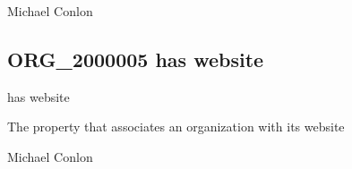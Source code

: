 \documentclass[letterpaper,10pt,english]{sphinxmanual}
\begin{document}
\begin{sphinxShadowBox}

\sphinxAtStartPar
{}
\end{sphinxShadowBox}

\begin{sphinxShadowBox}

\sphinxAtStartPar
Michael Conlon 
\end{sphinxShadowBox}
\begin{quote}

\ignorespaces \end{quote}


\subsection{ORG\_2000005 \sphinxhyphen{} has website}
\label{\detokenize{doc-ORG_2000005:org-2000005-has-website}}\label{\detokenize{doc-ORG_2000005:index-0}}\label{\detokenize{doc-ORG_2000005::doc}}
\begin{sphinxShadowBox}

\sphinxAtStartPar
has website
\end{sphinxShadowBox}

\begin{sphinxShadowBox}

\sphinxAtStartPar
{}
\end{sphinxShadowBox}

\begin{sphinxShadowBox}

\sphinxAtStartPar
The property that associates an organization with its website
\end{sphinxShadowBox}

\begin{sphinxShadowBox}

\sphinxAtStartPar
Michael Conlon 
\end{sphinxShadowBox}
\end{document}
